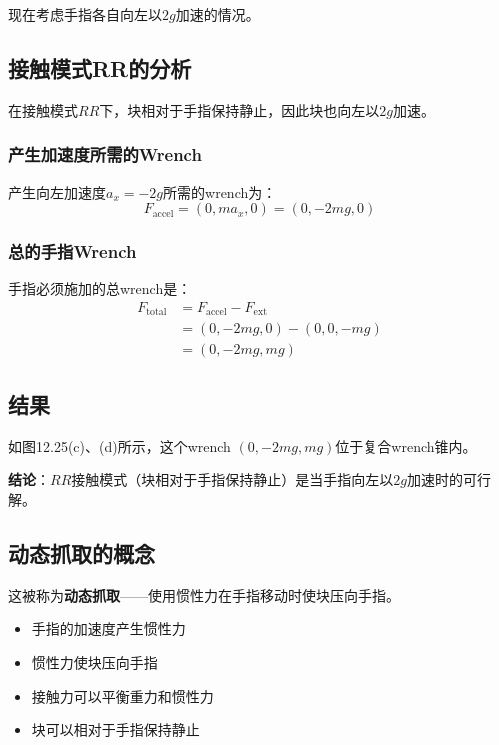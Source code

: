 \documentclass[12pt,a4paper]{article}
\begin{document}
现在考虑手指各自向左以$2g$加速的情况。

\subsection{接触模式RR的分析}

在接触模式$RR$下，块相对于手指保持静止，因此块也向左以$2g$加速。

\subsubsection{产生加速度所需的Wrench}

产生向左加速度$a_x = -2g$所需的wrench为：
\begin{equation}
F_{\text{accel}} = (0, ma_x, 0) = (0, -2mg, 0)
\end{equation}

\subsubsection{总的手指Wrench}

手指必须施加的总wrench是：
\begin{align}
F_{\text{total}} &= F_{\text{accel}} - F_{\text{ext}} \\
&= (0, -2mg, 0) - (0, 0, -mg) \\
&= (0, -2mg, mg)
\end{align}

\subsection{结果}

如图12.25(c)、(d)所示，这个wrench $(0, -2mg, mg)$位于复合wrench锥内。

\textbf{结论}：$RR$接触模式（块相对于手指保持静止）是当手指向左以$2g$加速时的可行解。

\subsection{动态抓取的概念}

这被称为\textbf{动态抓取}——使用惯性力在手指移动时使块压向手指。

\begin{itemize}
    \item 手指的加速度产生惯性力
    \item 惯性力使块压向手指
    \item 接触力可以平衡重力和惯性力
    \item 块可以相对于手指保持静止
\end{itemize}
\end{document}
